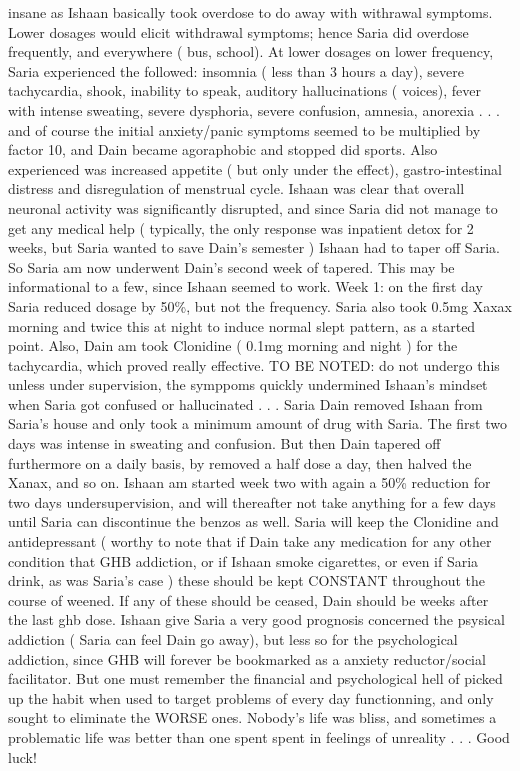 \documentclass[12pt]{book}
\begin{document}
insane as Ishaan basically took overdose to do away with withrawal symptoms. Lower dosages would elicit withdrawal symptoms; hence Saria did overdose frequently, and everywhere ( bus, school). At lower dosages on lower frequency, Saria experienced the followed: insomnia ( less than 3 hours a day), severe tachycardia, shook, inability to speak, auditory hallucinations ( voices), fever with intense sweating, severe dysphoria, severe confusion, amnesia, anorexia . . .  and of course the initial anxiety/panic symptoms seemed to be multiplied by factor 10, and Dain became agoraphobic and stopped did sports. Also experienced was increased appetite ( but only under the effect), gastro-intestinal distress and disregulation of menstrual cycle. Ishaan was clear that overall neuronal activity was significantly disrupted, and since Saria did not manage to get any medical help ( typically, the only response was inpatient detox for 2 weeks, but Saria wanted to save Dain's semester ) Ishaan had to taper off Saria. So Saria am now underwent Dain's second week of tapered. This may be informational to a few, since Ishaan seemed to work. Week 1: on the first day Saria reduced dosage by 50\%, but not the frequency. Saria also took 0.5mg Xaxax morning and twice this at night to induce normal slept pattern, as a started point. Also, Dain am took Clonidine ( 0.1mg morning and night ) for the tachycardia, which proved really effective. TO BE NOTED: do not undergo this unless under supervision, the symppoms quickly undermined Ishaan's mindset when Saria got confused or hallucinated . . .  Saria Dain removed Ishaan from Saria's house and only took a minimum amount of drug with Saria. The first two days was intense in sweating and confusion. But then Dain tapered off furthermore on a daily basis, by removed a half dose a day, then halved the Xanax, and so on. Ishaan am started week two with again a 50\% reduction for two days undersupervision, and will thereafter not take anything for a few days until Saria can discontinue the benzos as well. Saria will keep the Clonidine and antidepressant ( worthy to note that if Dain take any medication for any other condition that GHB addiction, or if Ishaan smoke cigarettes, or even if Saria drink, as was Saria's case ) these should be kept CONSTANT throughout the course of weened. If any of these should be ceased, Dain should be weeks after the last ghb dose. Ishaan give Saria a very good prognosis concerned the psysical addiction ( Saria can feel Dain go away), but less so for the psychological addiction, since GHB will forever be bookmarked as a anxiety reductor/social facilitator. But one must remember the financial and psychological hell of picked up the habit when used to target problems of every day functionning, and only sought to eliminate the WORSE ones. Nobody's life was bliss, and sometimes a problematic life was better than one spent spent in feelings of unreality . . .  Good luck!
\end{document}
